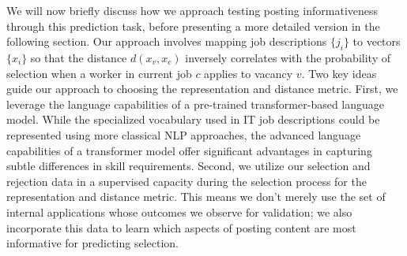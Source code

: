 We will now briefly discuss how we approach testing posting informativeness through this prediction task, before presenting a more detailed version in the following section. Our approach involves mapping job descriptions \(\{j_i\}\) to vectors \(\{x_i\}\) so that the distance \(d(x_v, x_c)\) inversely correlates with the probability of selection when a worker in current job \(c\) applies to vacancy \(v\). Two key ideas guide our approach to choosing the representation and distance metric. First, we leverage the language capabilities of a pre-trained transformer-based language model. While the specialized vocabulary used in IT job descriptions could be represented using more classical NLP approaches, the advanced language capabilities of a transformer model offer significant advantages in capturing subtle differences in skill requirements. Second, we utilize our selection and rejection data in a supervised capacity during the selection process for the representation and distance metric. This means we don't merely use the set of internal applications whose outcomes we observe for validation; we also incorporate this data to learn which aspects of posting content are most informative for predicting selection.





